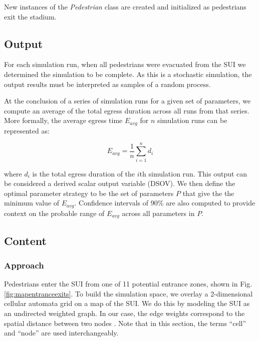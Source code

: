 \documentclass[12pt]{article}
\begin{document}
New instances of the \textit{Pedestrian} class are created and initialized
as pedestrians exit the stadium.

\subsection{Output}
For each simulation run, when all pedestrians were evacuated from the SUI we
determined the simulation to be complete. As this is a stochastic simulation,
the output results must be interpreted as samples of a random process.

At the conclusion of a series of simulation runs for a given set of parameters,
we compute an average of the total egress duration across all runs from that
series. More formally, the average egress time $E_{avg}$ for $n$ simulation runs
can be represented as:

\begin{equation}
E_{avg} = \frac{1}{n}\sum\limits_{i=1}^n d_i
\end{equation}

where $d_i$ is the total egress duration of the $i$th simulation run. This
output can be considered a derived scalar output variable (DSOV). We then
define the optimal parameter strategy to be the set of parameters $P$ that
give the the minimum value of $E_{avg}$. Confidence intervals of 90\% are also
computed to provide context on the probable range of $E_{avg}$ across all
parameters in $P$.

\subsection{Content}

\subsubsection{Approach}
Pedestrians enter the SUI from one of 11 potential entrance zones, shown in
Fig. \ref{fig:mapentranceexits}. To build the simulation space, we overlay a
2-dimensional cellular automata grid on a map of the SUI. We do this by modeling
the SUI as an undirected weighted graph. In our case, the edge weights correspond
to the spatial distance between two nodes \cite{west2001introduction}. Note
that in this section, the terms ``cell'' and ``node'' are used interchangeably.
\end{document}
